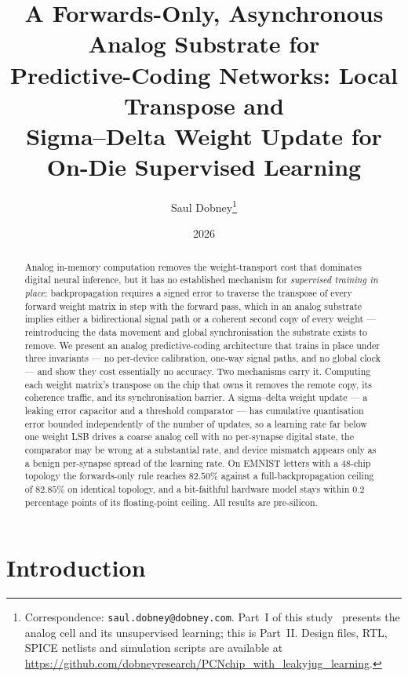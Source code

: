 \documentclass[11pt]{article}
\title{\bfseries A Forwards-Only, Asynchronous Analog Substrate for\\
Predictive-Coding Networks: Local Transpose and\\
Sigma--Delta Weight Update for On-Die Supervised Learning}
\author{Saul Dobney\thanks{Correspondence: \texttt{saul.dobney@dobney.com}.
Part~I of this study~\cite{dobney2026analog} presents the analog cell and its unsupervised
learning; this is Part~II. Design files, RTL, SPICE netlists and simulation scripts are available at
\url{https://github.com/dobneyresearch/PCNchip_with_leakyjug_learning}.}}
\date{2026}
\begin{document}
\maketitle

\begin{abstract}
Analog in-memory computation removes the weight-transport cost that dominates digital neural
inference, but it has no established mechanism for \emph{supervised training in place}: backpropagation
requires a signed error to traverse the transpose of every forward weight matrix in step with the
forward pass, which in an analog substrate implies either a bidirectional signal path or a coherent
second copy of every weight --- reintroducing the data movement and global synchronisation the
substrate exists to remove. We present an analog predictive-coding architecture that trains in place
under three invariants --- no per-device calibration, one-way signal paths, and no global clock ---
and show they cost essentially no accuracy. Two mechanisms carry it. Computing each weight matrix's
transpose on the chip that owns it removes the remote copy, its coherence traffic, and its
synchronisation barrier. A sigma--delta weight update --- a leaking error capacitor and a threshold
comparator --- has cumulative quantisation error bounded independently of the number of updates, so a
learning rate far below one weight LSB drives a coarse analog cell with no per-synapse digital state,
the comparator may be wrong at a substantial rate, and device mismatch appears only as a benign
per-synapse spread of the learning rate. On EMNIST letters with a 48-chip topology the forwards-only
rule reaches $82.50\%$ against a full-backpropagation ceiling of $82.85\%$ on identical topology, and
a bit-faithful hardware model stays within $0.2$ percentage points of its floating-point ceiling. All
results are pre-silicon.
\end{abstract}

\section{Introduction}\label{sec:intro}
\end{document}
